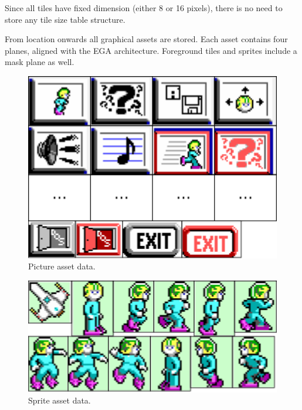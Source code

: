 \documentclass[book.tex]{subfiles}
\begin{document}
Since all tiles have fixed dimension (either 8 or 16 pixels), there is no need to store any tile size table structure. \\

\par
From  location onwards all graphical assets are stored. Each asset contains four planes, aligned with the EGA architecture. Foreground tiles and sprites include a mask plane as well.
 
\begin{figure}[H] 
  \centering 
  \includegraphics[width=1.0\textwidth, frame]{screenshots_300dpi/pics_assets.png}
  \caption{Picture asset data.}
  \label{fig:picture_assets}
\end{figure} 

\begin{figure}[H] 
  \centering 
  \includegraphics[width=1.0\textwidth, frame]{screenshots_300dpi/sprite_assets.png}
  \caption{Sprite asset data.}
  \label{fig:sprite_assets}
\end{figure} 
\end{document}
